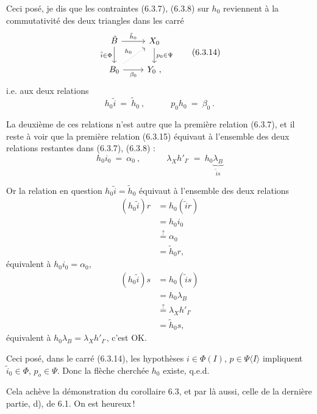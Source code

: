 Ceci posé, je dis que les contraintes (6.3.7), (6.3.8) sur $h_0$ reviennent à la commutativité des deux triangles dans les carré %
\[
\begin{tikzcd}
\tilde{B} \arrow[r, "\tilde{h}_0"] \arrow[d, "\tilde{i}\in\Phi"'] & X_0 \arrow[d, "p_0\in\Psi"] \\
B_0 \arrow[r, "\beta_0"'] \arrow[ur, dotted, "h_0"] & Y_0\ ,
\end{tikzcd}
\tag*{(6.3.14)}
\]
i.e. aux deux relations
\[
h_0\tilde{i} \ =\ \tilde{h}_0\ , \qquad\quad p_0h_0 \ =\ \beta_0\ .
\tag*{(6.3.15)}
\]

La deuxième de ces relations n'est autre que la première relation (6.3.7), et il reste à voir que la première relation (6.3.15) équivaut à l'ensemble des deux relations restantes dans (6.3.7), (6.3.8) :
\[
h_0i_0 \ =\ \alpha_0\ , \qquad\quad \lambda_X h'_{I'} \ =\ h_0\underbrace{\lambda_B}_{\tilde{i}s}
\tag*{(6.3.16)}
\]


Or la relation en question $h_0\tilde{i} = \tilde{h}_0$ équivaut à l'ensemble des deux relations
\[
\begin{aligned}
(h_0\tilde{i})r &= h_0(\tilde{i}r)\\
&= h_0i_0\\
&\overset{?}{=} \alpha_0\\
&= \tilde{h}_0r,
\end{aligned}
\]
équivalent à $h_0i_0 = \alpha_0$,
\[
\begin{aligned}
(h_0\tilde{i})s &= h_0(\tilde{i}s)\\
&= h_0\lambda_B\\
&\overset{?}{=} \lambda_Xh'_{I'}\\
&= \tilde{h}_0s,
\end{aligned}
\]
équivalent à $h_0\lambda_B = \lambda_Xh'_{I'}$, c'est OK.

Ceci posé, dans le carré (6.3.14), les hypothèses $i \in \Phi(I)$, $p \in \Psi\langle I\rangle$ impliquent $\tilde{i}_0 \in \Phi$, $p_o \in \Psi$. Donc la flèche cherchée $h_0$ existe, q.e.d. %

Cela achève la démonstration du corollaire 6.3, et par là aussi, celle de la dernière partie, d), de 6.1. On est heureux\,!


